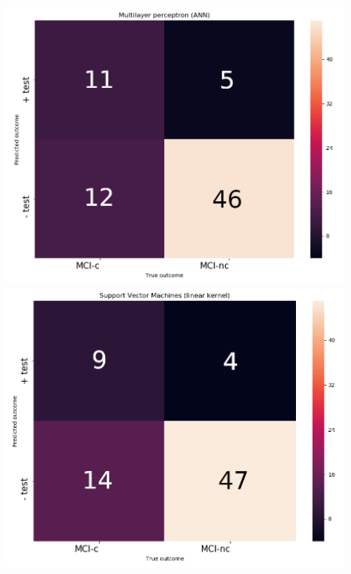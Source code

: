 \documentclass[a4paper,12pt]{elsarticle}  %
\begin{document}
	
			\begin{figure}[h]
			\centering
			\begin{minipage}{.33\textwidth}
				\centering
				\includegraphics[width=1\linewidth]{fig_MLP_fMRI_nodimreduc_CONFUSION.png}
			\end{minipage}%
			\begin{minipage}{.33\textwidth}
				\centering
				\includegraphics[width=1\linewidth]{fig_SVM_fMRI_nodimreduc_CONFUSION.png}

\end{minipage}
\end{figure}
\end{document}
